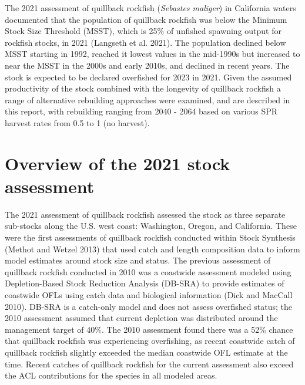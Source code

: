 \documentclass[11pt,
  english,
  a4paper,
]{article}
\begin{document}
The 2021 assessment of quillback rockfish (\emph{Sebastes maliger}) in California waters documented that the population of quillback rockfish was below the Minimum Stock Size Threshold (MSST), which is 25\% of unfished spawning output for rockfish stocks, in 2021 {(Langseth et al. 2021)\leavevmode\tagmcend\tagstructend}. The population declined below MSST starting in 1992, reached it lowest values in the mid-1990s but increased to near the MSST in the 2000s and early 2010s, and declined in recent years. The stock is expected to be declared overfished for 2023 in 2021. Given the assumed productivity of the stock combined with the longevity of quillback rockfish a range of alternative rebuilding approaches were examined, and are described in this report, with rebuilding ranging from 2040 - 2064 based on various SPR harvest rates from 0.5 to 1 (no harvest).

\leavevmode\tagmcend\tagstructend\par


\hypertarget{overview-of-the-2021-stock-assessment}{%
\section{Overview of the 2021 stock assessment}\label{overview-of-the-2021-stock-assessment}}

\leavevmode\tagmcend\tagstructend


The 2021 assessment of quillback rockfish assessed the stock as three separate sub-stocks along the U.S. west coast: Washington, Oregon, and California. These were the first assessments of quillback rockfish conducted within Stock Synthesis {(Methot and Wetzel 2013)\leavevmode\tagmcend\tagstructend} that used catch and length composition data to inform model estimates around stock size and status. The previous assessment of quillback rockfish conducted in 2010 was a coastwide assessment modeled using Depletion-Based Stock Reduction Analysis (DB-SRA) to provide estimates of coastwide OFLs using catch data and biological information {(Dick and MacCall 2010)\leavevmode\tagmcend\tagstructend}. DB-SRA is a catch-only model and does not assess overfished status; the 2010 assessment assumed that current depletion was distributed around the management target of 40\%. The 2010 assessment found there was a 52\% chance that quillback rockfish was experiencing overfishing, as recent coastwide catch of quillback rockfish slightly exceeded the median coastwide OFL estimate at the time. Recent catches of quillback rockfish for the current assessment also exceed the ACL contributions for the species in all modeled areas.
\end{document}
